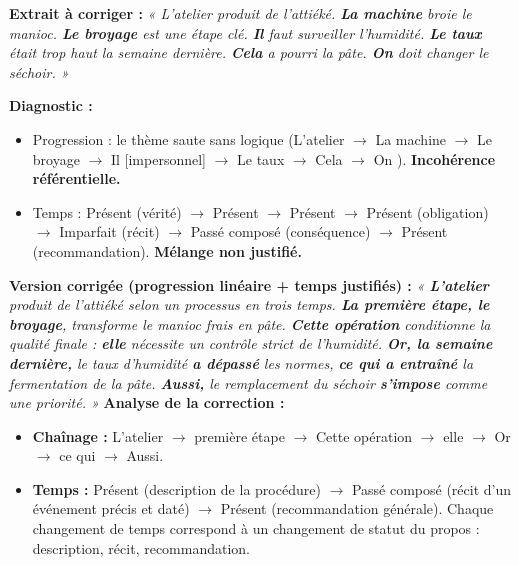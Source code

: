 \documentclass[11pt]{article}
\begin{document}
\begin{exoresolu}
\textbf{Extrait à corriger :}
\emph{« L'atelier produit de l'attiéké. \textbf{La machine} broie le manioc. \textbf{Le broyage} est une étape clé. \textbf{Il} faut surveiller l'humidité. \textbf{Le taux} était trop haut la semaine dernière. \textbf{Cela} a pourri la pâte. \textbf{On} doit changer le séchoir. »}

\textbf{Diagnostic :}
\begin{itemize}
    \item Progression : le thème saute sans logique (\og L'atelier \fg{} $\rightarrow$ \og La machine \fg{} $\rightarrow$ \og Le broyage \fg{} $\rightarrow$ \og Il \fg{} [impersonnel] $\rightarrow$ \og Le taux \fg{} $\rightarrow$ \og Cela \fg{} $\rightarrow$ \og On \fg{}). \textbf{Incohérence référentielle.}
    \item Temps : Présent (vérité) $\rightarrow$ Présent $\rightarrow$ Présent $\rightarrow$ Présent (obligation) $\rightarrow$ Imparfait (récit) $\rightarrow$ Passé composé (conséquence) $\rightarrow$ Présent (recommandation). \textbf{Mélange non justifié.}
\end{itemize}

\textbf{Version corrigée (progression linéaire + temps justifiés) :}
\emph{« \textbf{L'atelier} produit de l'attiéké selon un processus en trois temps. \textbf{La première étape, le broyage}, transforme le manioc frais en pâte. \textbf{Cette opération} conditionne la qualité finale : \textbf{elle} nécessite un contrôle strict de l'humidité. \textbf{Or, la semaine dernière,} le taux d'humidité \textbf{a dépassé} les normes, \textbf{ce qui a entraîné} la fermentation de la pâte. \textbf{Aussi,} le remplacement du séchoir \textbf{s'impose} comme une priorité. »}
\tcblower
\textbf{Analyse de la correction :}
\begin{itemize}
    \item \textbf{Chaînage :} L'atelier $\rightarrow$ première étape $\rightarrow$ Cette opération $\rightarrow$ elle $\rightarrow$ Or $\rightarrow$ ce qui $\rightarrow$ Aussi.
    \item \textbf{Temps :} Présent (description de la procédure) $\rightarrow$ Passé composé (récit d'un événement précis et daté) $\rightarrow$ Présent (recommandation générale). Chaque changement de temps correspond à un changement de statut du propos : description, récit, recommandation.
\end{itemize}
\end{exoresolu}
\end{document}
